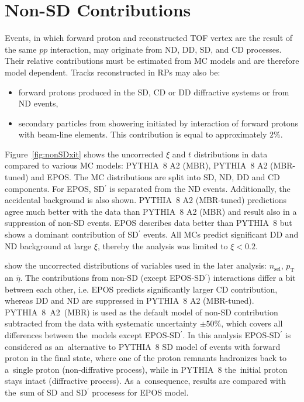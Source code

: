 \chapter{Non-SD Contributions}\label{section:star_nonSD}
Events, in which  forward proton and reconstructed TOF
vertex are the result of the same $pp$ interaction, may originate from \ac{ND}, \ac{DD}, \ac{SD}, and \ac{CD} processes.  Their relative contributions must be estimated from MC models and are therefore model dependent. Tracks reconstructed in \ac{RP}s  %
may also be:
\begin{itemize}
	\item forward protons produced in the \ac{SD}, \ac{CD} or \ac{DD} diffractive systems or from \ac{ND} events,
	\item secondary particles from showering initiated 
	by interaction of forward protons with beam-line elements. This contribution is equal to approximately $2\%$.
\end{itemize}

Figure~\ref{fig:nonSDxit} shows the uncorrected $\xi$ and $t$ distributions in data compared to various \ac{MC} models: PYTHIA~8 A2 (MBR), PYTHIA~8 A2 (MBR-tuned) and EPOS. The \ac{MC} distributions are split into \ac{SD}, \ac{ND}, \ac{DD} and \ac{CD} components. For EPOS, SD$^\prime$ is separated from the ND events. Additionally, the accidental background is also shown. PYTHIA~8 A2 (MBR-tuned) predictions agree much better with the data than PYTHIA~8 A2 (MBR)  and result also in a suppression of non-SD events. EPOS describes data better than PYTHIA~8 but shows a dominant contribution of SD$^\prime$ events. All MCs predict significant \ac{DD} and \ac{ND} background at large $\xi$, thereby  the analysis was limited to $\xi < 0.2$. 

  show the uncorrected distributions of variables used in the later analysis: $n_{\mathrm{sel}}$, $p_{\mathrm T}$ an $\bar{\eta}$. The  contributions from non-SD (except  EPOS-SD$^\prime$) interactions differ a bit between each other, i.e. EPOS predicts significantly larger CD contribution, whereas DD and ND are suppressed in PYTHIA~8 A2 (MBR-tuned).  PYTHIA~8~A2~(MBR) is used as the default model  of non-SD contribution subtracted from the data with systematic uncertainty $\pm50\%$, which covers all differences between the~models except EPOS-SD$^\prime$.  In this analysis EPOS-SD$^\prime$ is   considered as an~alternative to PYTHIA~8 SD model of events with forward proton in the final state,  where one of the proton remnants hadronizes back to a~single proton (non-diffrative process), while in  PYTHIA~8 the~initial proton stays intact (diffractive process). As a~consequence, results  are compared  with the~sum of SD and SD$^\prime$ procesess for EPOS model.   %

